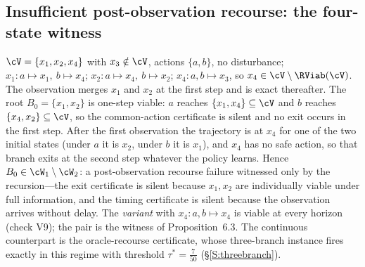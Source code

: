 \subsection{Insufficient post-observation recourse: the four-state witness}\label{S:A3}
$\cV=\{x_1,x_2,x_4\}$ with $x_3\notin\cV$, actions $\{a,b\}$, no disturbance; $x_1\colon a\mapsto x_1,\ b\mapsto x_4$; $x_2\colon a\mapsto x_4,\ b\mapsto x_2$; $x_4\colon a,b\mapsto x_3$, so $x_4\in\cV\setminus\RViab(\cV)$. The observation merges $x_1$ and $x_2$ at the first step and is exact thereafter. The root $B_0=\{x_1,x_2\}$ is one-step viable: $a$ reaches $\{x_1,x_4\}\subseteq\cV$ and $b$ reaches $\{x_4,x_2\}\subseteq\cV$, so the common-action certificate is silent and no exit occurs in the first step. After the first observation the trajectory is at $x_4$ for one of the two initial states (under $a$ it is $x_2$, under $b$ it is $x_1$), and $x_4$ has no safe action, so that branch exits at the second step whatever the policy learns. Hence $B_0\in\cW_1\setminus\cW_2$: a post-observation recourse failure witnessed only by the recursion---the exit certificate is silent because $x_1,x_2$ are individually viable under full information, and the timing certificate is silent because the observation arrives without delay. The \emph{variant} with $x_4\colon a,b\mapsto x_4$ is viable at every horizon (check V9); the pair is the witness of Proposition~6.3. The continuous counterpart is the oracle-recourse certificate, whose three-branch instance fires exactly in this regime with threshold $\tau^*=\tfrac7{50}$ (\S\ref{S:threebranch}).
